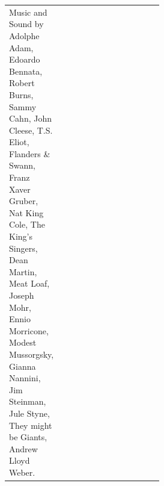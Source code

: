\documentclass{article}
\begin{document}
\begin{tabular}{>{\centering}p{0.21\linewidth}>{\centering}p{0.30\linewidth}>{\centering}p{}}
\scriptsize\raggedright
Music and Sound by
Adolphe Adam, %
Edoardo Bennata, %
Robert Burns, %
Sammy Cahn, %
John Cleese, %
T.S. Eliot, %
Flanders \& Swann, %
Franz Xaver Gruber, %
Nat King Cole, %
The King's Singers, %
Dean Martin, %
Meat Loaf, %
Joseph Mohr, %
Ennio Morricone, %
Modest Mussorgsky, %
Gianna Nannini, %
Jim Steinman, %
Jule Styne, %
They might be Giants, %
Andrew Lloyd Weber. %


\end{tabular}
\vfill
\end{document}
